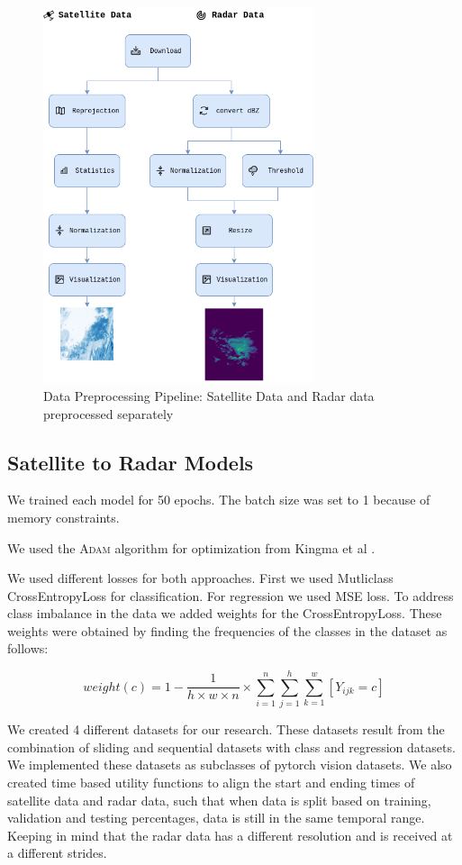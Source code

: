 \begin{figure}
  \centering
  \includegraphics[width=225pt]{./images/prepro.png}
  \caption{Data Preprocessing Pipeline: Satellite Data and Radar data preprocessed separately}
  \label{fig:preprocessing}
\end{figure}

\subsection{Satellite to Radar Models}
We trained each model for 50 epochs. The batch size was set to 1 because of memory constraints.

We used the \textsc{Adam} algorithm for optimization from Kingma et al \cite{kingma-2014}.

We used different losses for both approaches. First we used Mutliclass CrossEntropyLoss for classification.
For regression we used MSE loss. To address class imbalance in the data we added weights for the CrossEntropyLoss. These weights were
obtained by finding the frequencies of the classes in the dataset as follows:

$$weight(c) = 1 - \frac{1}{h\times w \times n} \times \sum_{i=1}^n \sum_{j=1}^h \sum_{k=1}^w [Y_{ijk} = c]$$


We created 4 different datasets for our research. These datasets result from the combination of sliding and sequential datasets with class and regression datasets.
We implemented these datasets as subclasses of pytorch vision datasets. We also created time based utility functions to align the start and ending times of satellite data and radar data, such that when data is split based on training, validation and testing percentages, data is still in the same temporal range. Keeping in mind that the radar data has a different resolution and is received at a different strides.

